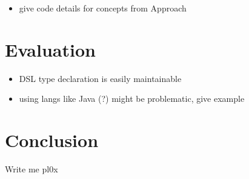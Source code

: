 \documentclass[oribibl]{llncs}
\begin{document}
\begin{itemize}
\item give code details for concepts from Approach
\end{itemize}

\section{Evaluation}
\label{sec:evaluation}

\begin{itemize}
\item DSL type declaration is easily maintainable
\item using langs like Java (?) might be problematic, give example
\end{itemize}


\section{Conclusion}
\label{sec:conclusion}
Write me pl0x

\newpage
\nocite{*}


\end{document}
